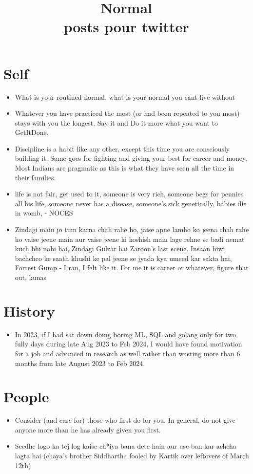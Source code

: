 \documentclass{article}
\title {\large {\textbf {Normal}} \\ \small {posts pour twitter}}
\begin{document}
\maketitle

\section {Self}
\begin{itemize}
\item What is your routined normal, what is your normal you cant live without
\item Whatever you have practiced the most (or had been repeated to you most) stays with you the longest. Say it and Do it more what you want to GetItDone.
\item Discipline is a habit like any other, except this time you are consciously building it. Same goes for fighting and giving your best for career and money. Most Indians are pragmatic as this is what they have seen all the time in their families.
\item life is not fair, get used to it, someone is very rich, someone begs for pennies all his life, someone never has a disease, someone's sick genetically, babies die in womb, - NOCES 
\item Zindagi main jo tum karna chah rahe ho, jaise apne lamho ko jeena chah rahe ho vaise jeene main aur vaise jeene ki koshish main lage rehne se badi nemat kuch bhi nahi hai, Zindagi Gulzar hai Zaroon's last scene. Insaan biwi bachchco ke saath khushi ke pal jeene se jyada kya umeed kar sakta hai, Forrest Gump - I ran, I felt like it. For me it is career or whatever, figure that out, kunas
\end{itemize}

\section {History}
\begin{itemize}
\item In 2023, if I had sat down doing boring ML, SQL and golang only for two fully days during late Aug 2023 to Feb 2024, I would have found motivation for a job and advanced in research as well rather than wasting more than 6 months from late August 2023 to Feb 2024. 

\end{itemize}

\section{People}
\begin{itemize}
\item Consider (and care for) those who first do for you. In general, do not give anyone more than he has already given you first.
\item Seedhe logo ka tej log kaise ch*iya bana dete hain aur use ban kar achcha lagta hai (chaya's brother Siddhartha fooled by Kartik over leftovers of March 12th)

\end{itemize}

 
\end{document}
